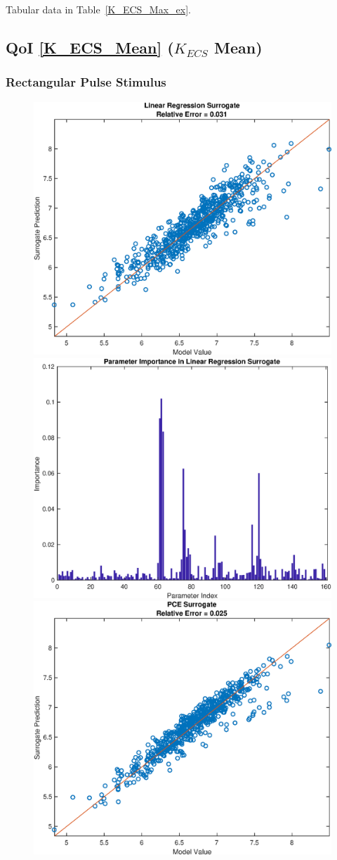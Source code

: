 \documentclass[12pt]{article}
\numberwithin{equation}{section}
\begin{document}
Tabular data in Table~\ref{K_ECS_Max_ex}.

\newpage

\subsection{QoI \eqref{K_ECS_Mean} ($K_{ECS}$ Mean)}

\newpage

\subsubsection{Rectangular Pulse Stimulus}

\begin{figure}[h]
\centering
\includegraphics[width=.49 \textwidth]{Figures/K_ECS_Mean_QoI_LR_Prediction_Rectangular.eps}
\includegraphics[width=.49 \textwidth]{Figures/K_ECS_Mean_QoI_LR_VI_Rectangular.eps}\\
\includegraphics[width=.49 \textwidth]{Figures/K_ECS_Mean_QoI_PCE_Prediction_Rectangular.eps}

\end{figure}
\end{document}
